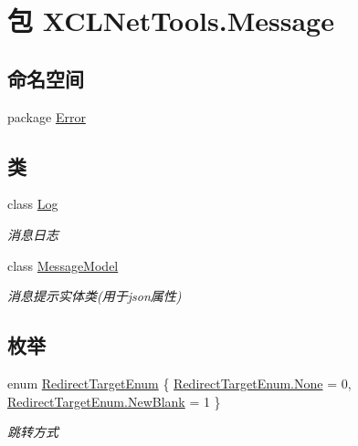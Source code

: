 \hypertarget{namespace_x_c_l_net_tools_1_1_message}{\section{包 X\-C\-L\-Net\-Tools.\-Message}
\label{namespace_x_c_l_net_tools_1_1_message}
}
\subsection*{命名空间}
\begin{DoxyCompactItemize}
\item 
package \hyperlink{namespace_x_c_l_net_tools_1_1_message_1_1_error}{Error}
\end{DoxyCompactItemize}
\subsection*{类}
\begin{DoxyCompactItemize}
\item 
class \hyperlink{class_x_c_l_net_tools_1_1_message_1_1_log}{Log}
\begin{DoxyCompactList}\small\item\em 消息日志 \end{DoxyCompactList}\item 
class \hyperlink{class_x_c_l_net_tools_1_1_message_1_1_message_model}{Message\-Model}
\begin{DoxyCompactList}\small\item\em 消息提示实体类(用于json属性) \end{DoxyCompactList}\end{DoxyCompactItemize}
\subsection*{枚举}
\begin{DoxyCompactItemize}
\item 
enum \hyperlink{namespace_x_c_l_net_tools_1_1_message_a7f19b509275317a7b01e7dc5cb615095}{Redirect\-Target\-Enum} \{ \hyperlink{namespace_x_c_l_net_tools_1_1_message_a7f19b509275317a7b01e7dc5cb615095a6adf97f83acf6453d4a6a4b1070f3754}{Redirect\-Target\-Enum.\-None} = 0, 
\hyperlink{namespace_x_c_l_net_tools_1_1_message_a7f19b509275317a7b01e7dc5cb615095aa9453646c9602d8a4f00d42b7c9844ab}{Redirect\-Target\-Enum.\-New\-Blank} = 1
 \}
\begin{DoxyCompactList}\small\item\em 跳转方式 \end{DoxyCompactList}\end{DoxyCompactItemize}


